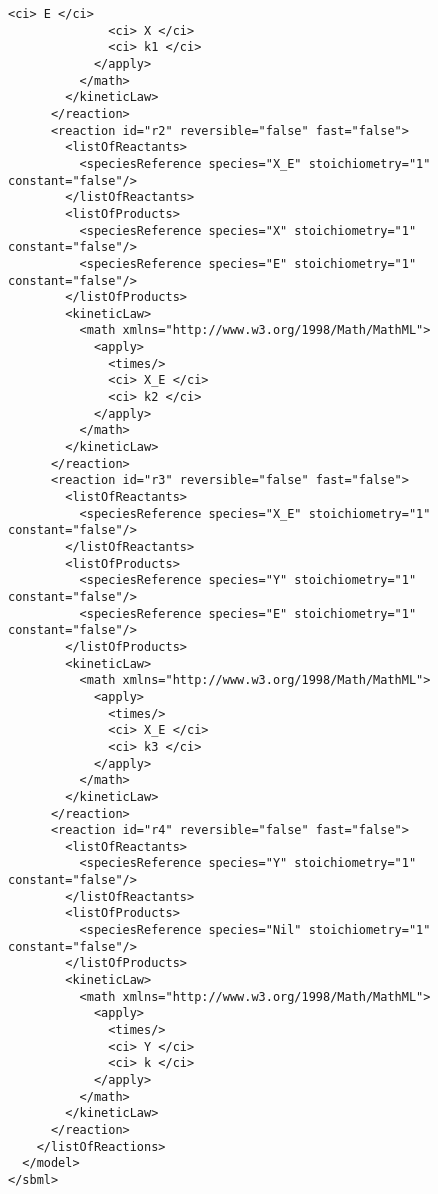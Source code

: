 \begin{lstlisting}[xrightmargin=0in]
              <ci> E </ci>
              <ci> X </ci>
              <ci> k1 </ci>
            </apply>
          </math>
        </kineticLaw>
      </reaction>
      <reaction id="r2" reversible="false" fast="false">
        <listOfReactants>
          <speciesReference species="X_E" stoichiometry="1" constant="false"/>
        </listOfReactants>
        <listOfProducts>
          <speciesReference species="X" stoichiometry="1" constant="false"/>
          <speciesReference species="E" stoichiometry="1" constant="false"/>
        </listOfProducts>
        <kineticLaw>
          <math xmlns="http://www.w3.org/1998/Math/MathML">
            <apply>
              <times/>
              <ci> X_E </ci>
              <ci> k2 </ci>
            </apply>
          </math>
        </kineticLaw>
      </reaction>
      <reaction id="r3" reversible="false" fast="false">
        <listOfReactants>
          <speciesReference species="X_E" stoichiometry="1" constant="false"/>
        </listOfReactants>
        <listOfProducts>
          <speciesReference species="Y" stoichiometry="1" constant="false"/>
          <speciesReference species="E" stoichiometry="1" constant="false"/>
        </listOfProducts>
        <kineticLaw>
          <math xmlns="http://www.w3.org/1998/Math/MathML">
            <apply>
              <times/>
              <ci> X_E </ci>
              <ci> k3 </ci>
            </apply>
          </math>
        </kineticLaw>
      </reaction>
      <reaction id="r4" reversible="false" fast="false">
        <listOfReactants>
          <speciesReference species="Y" stoichiometry="1" constant="false"/>
        </listOfReactants>
        <listOfProducts>
          <speciesReference species="Nil" stoichiometry="1" constant="false"/>
        </listOfProducts>
        <kineticLaw>
          <math xmlns="http://www.w3.org/1998/Math/MathML">
            <apply>
              <times/>
              <ci> Y </ci>
              <ci> k </ci>
            </apply>
          </math>
        </kineticLaw>
      </reaction>
    </listOfReactions>
  </model>
</sbml>
\end{lstlisting}

